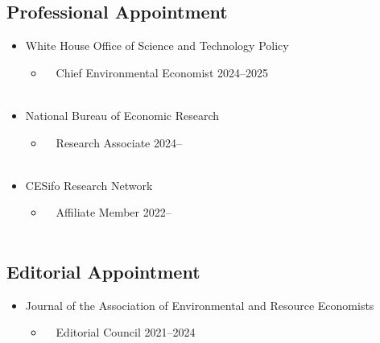 \documentclass[11pt]{res} %
\begin{document}
\begin{resume}
\subsection{Professional Appointment}
	\begin{itemize} \itemsep -12pt
		\item[] White House Office of Science and Technology Policy
		\vspace{-0.05in} 
		\begin{itemize}
			\item[] \,\,\,\, Chief Environmental Economist \hfill 2024--2025\\\
		\end{itemize}
		\vspace{-0.05in}
		\item[] National Bureau of Economic Research 
		\vspace{-0.05in} 
		\begin{itemize}
			\item[] \,\,\,\, Research Associate \hfill 2024--\\\
		\end{itemize}
		\vspace{-0.05in}
		\item[] CESifo Research Network 
		\vspace{-0.05in} 
		\begin{itemize}
			\item[] \,\,\,\, Affiliate Member \hfill 2022--\\\
		\end{itemize}
	\end{itemize}
\vspace{-0.5in}


\subsection{Editorial Appointment}
	\begin{itemize} \itemsep -12pt
		\item[] Journal of the Association of Environmental and Resource Economists 
		\vspace{-0.05in} 
		\begin{itemize}
			\item[] \,\,\,\, Editorial Council \hfill 2021--2024\\\
		\end{itemize}
	\end{itemize}
\vspace{-0.5in}


\end{resume}
\end{document}
